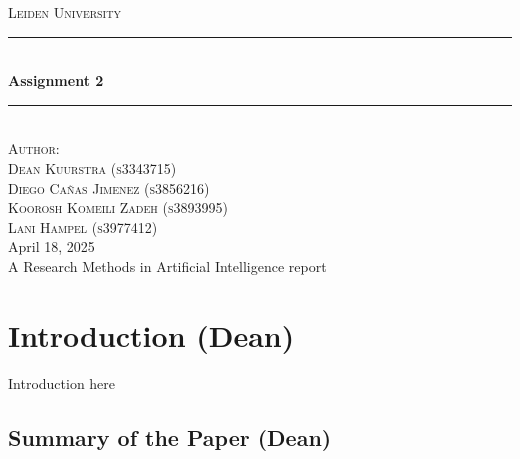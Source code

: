\documentclass[12pt]{article}
\begin{document}

\begin{titlepage}

\newcommand{\HRule}{\rule{\linewidth}{0.5mm}}

\center
\begin{figure}[H]  \end{figure}
\textsc{\LARGE Leiden University}\\[1.5cm]


\HRule \\[0.9cm]
{ \huge \bfseries Assignment 2}\\[0.1cm] %
\HRule \\[1.5cm]

\textsc{Author:}\\[0.3cm]
\textsc{\Large Dean Kuurstra (s3343715)}\\[0.5cm]
\textsc{\Large Diego Cañas Jimenez (s3856216)}\\[0.5cm]
\textsc{\Large Koorosh Komeili Zadeh (s3893995)}\\[0.5cm]
\textsc{\Large Lani Hampel (s3977412)}\\[0.5cm]

\large April 18, 2025\\
A Research Methods in Artificial Intelligence report\\

\vfill %

\end{titlepage}

\newpage
\section{Introduction (Dean)}
Introduction here

\subsection{Summary of the Paper (Dean)}
\end{document}
